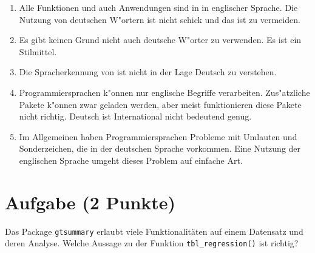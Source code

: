 \documentclass[a4paper, 10pt]{scrartcl}\usepackage[]{graphicx}\usepackage[]{xcolor}
\begin{document}
\begin{enumerate}
\item [\textbf{A} \msquare] Alle Funktionen und auch Anwendungen sind in \Rlogo in englischer Sprache. Die Nutzung von deutschen W{"o}rtern ist nicht schick und das ist zu vermeiden.
\item [\textbf{B} \msquare] Es gibt keinen Grund nicht auch deutsche W{"o}rter zu verwenden. Es ist ein Stilmittel.
\item [\textbf{C} \msquare] Die Spracherkennung von \Rlogo ist nicht in der Lage Deutsch zu verstehen.
\item [\textbf{D} \msquare] Programmiersprachen k{"o}nnen nur englische Begriffe verarbeiten. Zus{"a}tzliche Pakete k{"o}nnen zwar geladen werden, aber meist funktionieren diese Pakete nicht richtig. Deutsch ist International nicht bedeutend genug.
\item [\textbf{E} \msquare] Im Allgemeinen haben Programmiersprachen Probleme mit Umlauten und Sonderzeichen, die in der deutschen Sprache vorkommen. Eine Nutzung der englischen Sprache umgeht dieses Problem auf einfache Art.
\end{enumerate}

\section{Aufgabe \hfill (2 Punkte)}




Das \Rlogo Package \texttt{gtsummary} erlaubt viele Funktionalit{\"a}ten auf
einem Datensatz und deren Analyse. Welche Aussage zu der Funktion
\texttt{tbl\_regression()} ist richtig?
\end{document}
